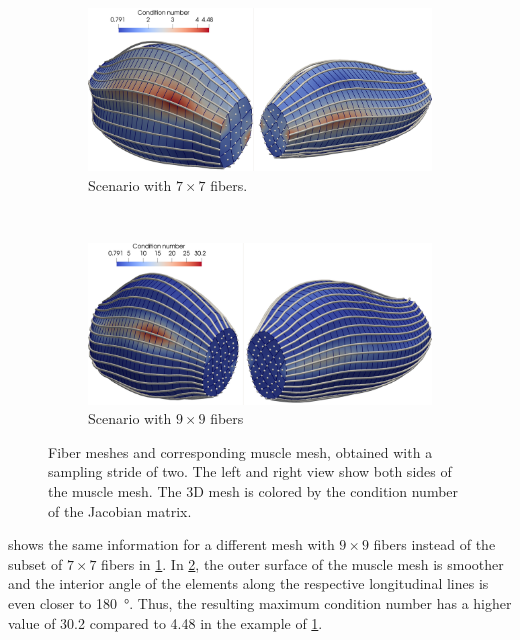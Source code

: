 \begin{figure}%
  \centering%
  \begin{subfigure}{0.9\textwidth}
    \centering
    \includegraphics[width=\textwidth]{images/implementation/condition_number.png}%
    \caption{Scenario with $7\times 7$ fibers.}%
    \label{fig:condition_number7x7}%
  \end{subfigure}\\[4mm]
  \begin{subfigure}{0.9\textwidth}
    \centering
    \includegraphics[width=\textwidth]{images/implementation/condition_number2.png}%
    \caption{Scenario with $9\times 9$ fibers}%
    \label{fig:condition_number9x9}%
  \end{subfigure}
  \caption{Fiber meshes and corresponding muscle mesh, obtained with a sampling stride of two. The left and right view show both sides of the muscle mesh. The 3D mesh is colored by the condition number of the Jacobian matrix.}%
  \label{fig:condition_number2}%
\end{figure}%

 shows the same information for a different mesh with $9\times 9$ fibers instead of the subset of $7\times 7$ fibers in \cref{fig:condition_number7x7}. In \cref{fig:condition_number9x9}, the outer surface of the muscle mesh is smoother and the interior angle of the elements along the respective longitudinal lines is even closer to \SI{180}{\degree}. Thus, the resulting maximum condition number has a higher value of \num{30.2} compared to \num{4.48} in the example of \cref{fig:condition_number7x7}.

